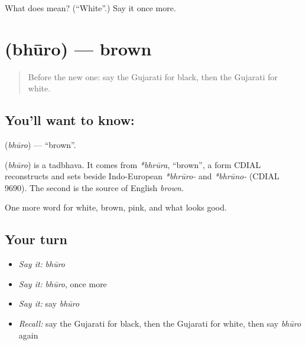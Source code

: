 \begin{tcolorbox}[breakable,colback=teal!4,colframe=teal!35!black,title={Before you move on}]
What does  mean? (\textquotedblleft{}White\textquotedblright{}.) Say it once more.
\end{tcolorbox}
\section[\texorpdfstring{\gu{ભૂરો} (bhūro)}{ભૂરો (bhūro)}]{ (bhūro) — brown}

\label{lesson:GU-C71-brown}



\begin{quote}
Before the new one: say the Gujarati for black, then the Gujarati for white.
\end{quote}

\subsection*{You'll want to know: }
\textbf{} (\emph{bhūro}) — \textquotedblleft{}brown\textquotedblright{}.

\begin{cousinweb}
\textbf{} (\emph{bhūro}) is a tadbhava. It comes from \emph{*bhrūra}, \textquotedblleft{}brown\textquotedblright{}, a form CDIAL reconstructs and sets beside Indo-European \emph{*bhrūro-} and \emph{*bhrūno-} (CDIAL 9690). The second is the source of English \emph{brown}.
\end{cousinweb}

\begin{grammarlens}[title={What you've built}]
One more word for white, brown, pink, and what looks good.
\end{grammarlens}

\subsection*{Your turn}
\begin{itemize}
\raggedright
  \item \emph{Say it:} \emph{bhūro}
  \item \emph{Say it:} \emph{bhūro}, once more
  \item \emph{Say it:} say \emph{bhūro}
  \item \emph{Recall:} say the Gujarati for black, then the Gujarati for white, then say \emph{bhūro} again
\end{itemize}

